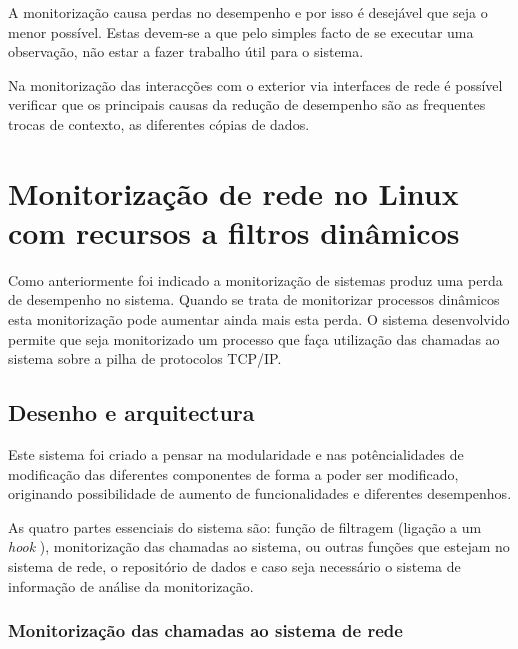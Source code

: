 \documentclass[runningheads,a4paper]{llncs}
\begin{document}
A monitorização causa perdas no desempenho e por isso é desejável que seja o menor possível. Estas devem-se a que pelo simples facto de se executar uma observação, não estar a fazer trabalho útil para o sistema.

Na monitorização das interacções com o exterior via interfaces de rede é possível verificar que os principais causas da redução de desempenho são as frequentes trocas de contexto, as diferentes cópias de dados.


\section{Monitorização de rede no Linux com recursos a filtros dinâmicos}
\label{sec:mon_network__with_dynamic_filters_linux}

Como anteriormente foi indicado a monitorização de sistemas produz uma perda de desempenho no sistema. Quando se trata de monitorizar processos dinâmicos esta monitorização pode aumentar ainda mais esta perda. O sistema desenvolvido permite que seja monitorizado um processo que faça utilização das chamadas ao sistema sobre a pilha de protocolos TCP/IP.


\subsection{Desenho e arquitectura}
\label{sub:architecture}

Este sistema foi criado a pensar na modularidade e nas potêncialidades de modificação das diferentes componentes de forma a poder ser modificado, originando possibilidade de aumento de funcionalidades e diferentes desempenhos.

As quatro partes essenciais do sistema são: função de filtragem (ligação a um \textit{hook} ), monitorização das chamadas ao sistema, ou outras funções que estejam no sistema de rede, o repositório de dados e caso seja necessário o sistema de informação de análise da monitorização.

\subsubsection*{Monitorização das chamadas ao sistema de rede}
\label{subsub:mon_syscalls}
\end{document}
